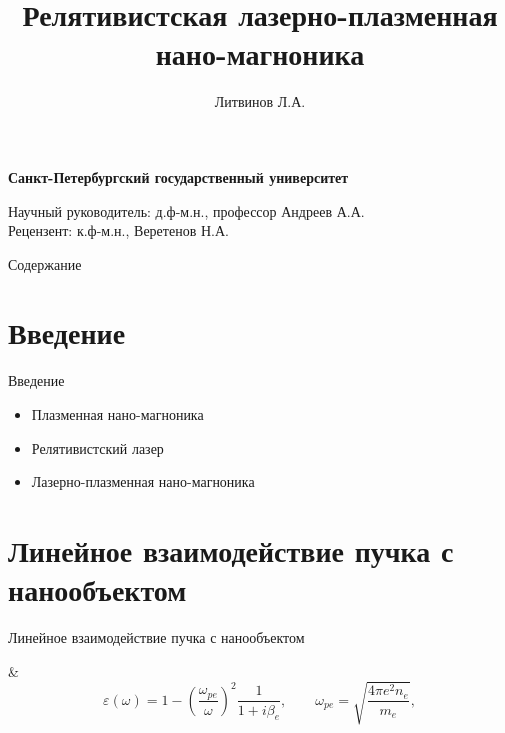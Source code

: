 \documentclass[aspectratio=169]{beamer}
\title{Релятивистская лазерно-плазменная нано-магноника}
\author{Литвинов Л.А.}
\date{}
\renewcommand{\maketitle}{
\vspace{0.5\baselineskip}

\begin{center}
    \textbf{Санкт-Петербургский государственный университет}
\end{center}

\titlepage
\vspace{\baselineskip}
\begin{center}
    \small
    \vspace{-2.5\baselineskip}
    Научный руководитель: д.ф-м.н., профессор Андреев А.А.\\
    Рецензент: к.ф-м.н., Веретенов Н.А.\\
\end{center}
}
\begin{document}
    \begin{frame}[plain]
        \maketitle
    \end{frame}

    \begin{frame}{Содержание}
        \tableofcontents
    \end{frame}

    \section{Введение}
    \begin{frame}{Введение}
        \begin{itemize}
            \item Плазменная нано-магноника
            \item Релятивистский лазер
            \item Лазерно-плазменная нано-магноника
        \end{itemize}
    \end{frame}

    \section{Линейное взаимодействие пучка с нанообъектом}
    \begin{frame}{Линейное взаимодействие пучка с нанообъектом}
        \begin{tabular}
             &
            \begin{equation}
                \varepsilon (\omega) = 1 - {\left( \frac{\omega_{pe}}{\omega} \right)}^2 \frac{1}{1+i \beta_{e}}, \qquad \omega_{pe} = \sqrt{\frac{4 \pi e^2 n_e}{m_e}},
                \label{eps_plasma}
            \end{equation}
        \end{tabular}
    \end{frame}
\end{document}
